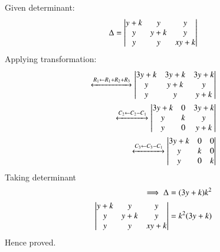 Given determinant:
\begin{align}
\Delta =\begin{vmatrix}y+k&y&y\\y&y+k&y\\y&y&xy+k\end{vmatrix}
\end{align}
Applying transformation:
\begin{align}
\xleftrightarrow[]{R_1 \leftarrow R_1+ R_2+ R_3} 
\begin{vmatrix}3y+k&3y+k&3y+k\\y&y+k&y\\y&y&y+k\end{vmatrix}
\\
\xleftrightarrow[]{C_2 \leftarrow C_2- C_1} 
\begin{vmatrix}3y+k&0&3y+k\\y&k&y\\y&0&y+k\end{vmatrix}
\\
\xleftrightarrow[]{C_3 \leftarrow C_3- C_1} 
\begin{vmatrix}3y+k&0&0\\y&k&0\\y&0&k\end{vmatrix}
\end{align}
Taking determinant
\begin{align}
\implies\Delta =(3y+k)k^2\\
\begin{vmatrix}y+k&y&y\\y&y+k&y\\y&y&xy+k\end{vmatrix}=k^2(3y+k)
\end{align}
Hence proved.
